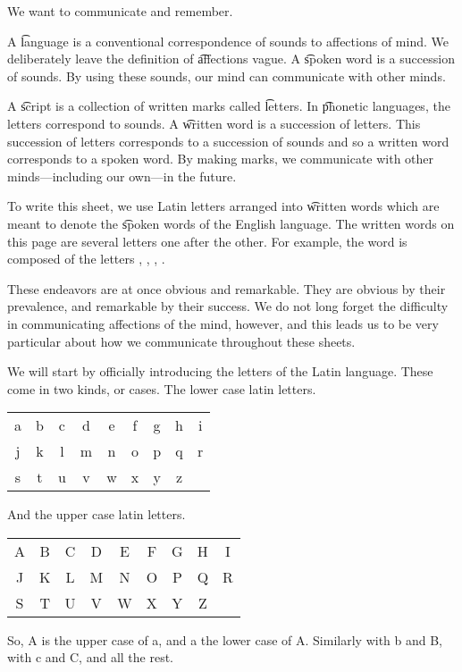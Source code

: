 

We want to communicate and remember.


A \t{language} is a conventional correspondence of sounds to affections of mind.
We deliberately leave the definition of \t{affections} vague.
A \t{spoken word} is a succession of sounds.
By using these sounds, our mind can communicate with other minds.

A \t{script} is a collection of written marks called \t{letters}.
In \t{phonetic} languages, the letters correspond to sounds.
A \t{written word} is a succession of letters.
This succession of letters corresponds to a succession of sounds and so a written word corresponds to a spoken word.
By making marks, we communicate with other minds---including our own---in the future.

To write this sheet, we use Latin letters arranged into \t{written words} which are meant to denote the \t{spoken words} of the English language.
The written words on this page are several letters one after the other.
For example, the word  is composed of the letters , , , .

These endeavors are at once obvious and remarkable.
They are obvious by their prevalence, and remarkable by their success.
We do not long forget the difficulty in communicating affections of the mind, however, and this leads us to be very particular about how we communicate throughout these sheets.


We will start by officially introducing the letters of the Latin language.
These come in two kinds, or cases.
The lower case latin letters.
\begin{center}
\begin{tabular}{ccccccccc}
  a & b & c & d & e & f & g & h & i \\
  j & k & l & m & n & o & p & q & r \\
  s & t & u & v & w & x & y & z &   \\
\end{tabular}
\end{center}
And the upper case latin letters.
\begin{center}
\begin{tabular}{ccccccccc}
  A & B & C & D & E & F & G & H & I \\
  J & K & L & M & N & O & P & Q & R \\
  S & T & U & V & W & X & Y & Z &   \\
\end{tabular}
\end{center}
So, A is the upper case of a, and a the lower case of A.
Similarly with b and B, with c and C, and all the rest.

